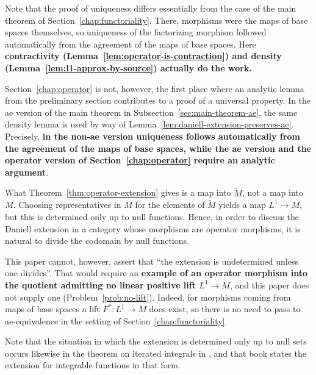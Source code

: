 \begin{remark}\label{rem:uniqueness-has-content}
  Note that the proof of uniqueness differs essentially from the case of the
  main theorem of Section~\ref{chap:functoriality}.
  There, morphisms were the maps of base spaces themselves, so uniqueness of the
  factorizing morphism followed automatically from the agreement of the maps of
  base spaces.
  Here \textbf{contractivity
  (Lemma~\ref{lem:operator-is-contraction}) and density
  (Lemma~\ref{lem:l1-approx-by-source}) actually do the work.}

  Section~\ref{chap:operator} is not, however, the first place where an analytic
  lemma from the preliminary section contributes to a proof of a universal
  property.
  In the ae version of the main theorem in
  Subsection~\ref{sec:main-theorem-ae}, the same density lemma is used by way of
  Lemma~\ref{lem:daniell-extension-preserves-ae}.
  Precisely, \textbf{in the non-ae version uniqueness follows automatically from
  the agreement of the maps of base spaces, while the ae version and the
  operator version of Section~\ref{chap:operator} require an analytic
  argument}.
\end{remark}

\begin{remark}\label{rem:ae-is-forced}
  What Theorem~\ref{thm:operator-extension} gives is a map into
  $\widetilde{M}$, not a map into $M$.
  Choosing representatives in $M$ for the elements of $\widetilde{M}$ yields a
  map $L^1\to M$, but this is determined only up to null functions.
  Hence, in order to discuss the Daniell extension in a category whose morphisms
  are operator morphisms, it is natural to divide the codomain by null
  functions.

  This paper cannot, however, assert that ``the extension is undetermined unless
  one divides''.
  That would require an \textbf{example of an operator morphism into the
  quotient admitting no linear positive lift $L^1\to M$}, and this paper does
  not supply one (Problem~\ref{prob:no-lift}).
  Indeed, for morphisms coming from maps of base spaces a lift
  $F^*:L^1\to M$ does exist, so there is no need to pass to ae-equivalence in
  the setting of Section~\ref{chap:functoriality}.

  Note that the situation in which the extension is determined only up to null
  sets occurs likewise in the theorem on iterated integrals in
  \cite{Yamagami}, and that book states the extension for integrable functions
  in that form.
\end{remark}

